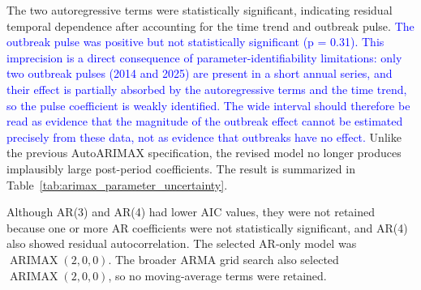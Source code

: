 \documentclass[utf8]{FrontiersinHarvard} %
\begin{document}
The two autoregressive terms were statistically significant, indicating residual temporal dependence after accounting for the time trend and outbreak pulse. \textcolor{blue}{The outbreak pulse was positive but not statistically significant (p = 0.31). This imprecision is a direct consequence of parameter-identifiability limitations: only two outbreak pulses (2014 and 2025) are present in a short annual series, and their effect is partially absorbed by the autoregressive terms and the time trend, so the pulse coefficient is weakly identified. The wide interval should therefore be read as evidence that the magnitude of the outbreak effect cannot be estimated precisely from these data, not as evidence that outbreaks have no effect.} Unlike the previous AutoARIMAX specification, the revised model no longer produces implausibly large post-period coefficients. The result is summarized in Table~\ref{tab:arimax_parameter_uncertainty}.

\begin{table}[h!]
\centering
\caption{ARIMAX order selection for AR-only candidates.}
\label{tab:arimax_ar_order_selection}
\end{table}

Although AR(3) and AR(4) had lower AIC values, they were not retained because one or more AR coefficients were not statistically significant, and AR(4) also showed residual autocorrelation. The selected AR-only model was \(\operatorname{ARIMAX}(2,0,0)\). The broader ARMA grid search also selected \(\operatorname{ARIMAX}(2,0,0)\), so no moving-average terms were retained.
\end{document}
